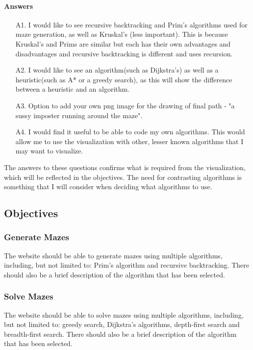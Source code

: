 \documentclass{article}
\begin{document}
\paragraph*{Answers}
\begin{enumerate}
    \item[A1.]I would like to see recursive backtracking and Prim's algorithms used for maze generation, as well as Kruskal's (less important). This is because Kruskal's and Prims are similar but each has their own advantages and disadvantages and recursive backtracking is different and uses recursion.
    \item[A2.]I would like to see an algorithm(such as Dijkstra's) as well as a heuristic(such as A* or a greedy search), as this will show the difference between a heuristic and an algorithm.
    \item[A3.]Option to add your own png image for the drawing of final path - "a sussy imposter running around the maze".
    \item[A4.]I would find it useful to be able to code my own algorithms. This would allow me to use the visualization with other, lesser known algorithms that I may want to visualize.
\end{enumerate}
The answers to these questions confirms what is required from the visualization, which will be reflected in the objectives. The need for contrasting algorithms is something that I will consider when deciding what algorithms to use.
\subsection{Objectives}
\subsubsection{Generate Mazes}
The website should be able to generate mazes using multiple algorithms, including, but not limited to: Prim's algorithm and recursive backtracking. There should also be a brief description of the algorithm that has been selected.

\subsubsection{Solve Mazes}
The website should be able to solve mazes using multiple algorithms, including, but not limited to: greedy search, Dijkstra's algorithms, depth-first search and breadth-first search. There should also be a brief description of the algorithm that has been selected.
\end{document}
